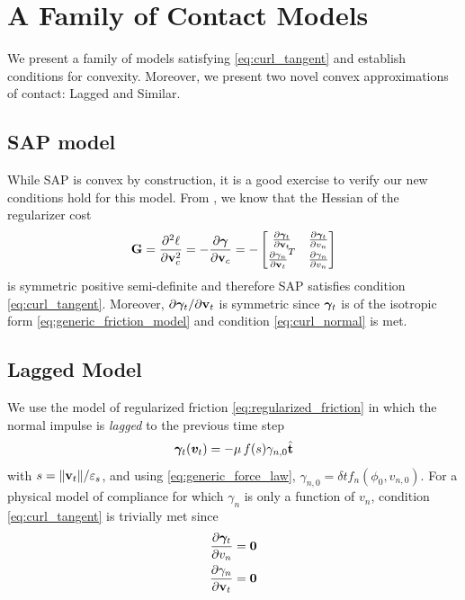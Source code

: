 \section{A Family of Contact Models}
\label{sec:models_family}

We present a family of models satisfying \eqref{eq:curl_tangent} and establish
conditions for convexity. Moreover, we present two novel convex approximations
of contact: Lagged and Similar.

\subsection{SAP model}

While SAP \cite{bib:castro2022unconstrained} is convex by construction, it is a
good exercise to verify our new conditions hold for this model. From
\cite{bib:castro2022unconstrained}, we know that the Hessian of the regularizer
cost
\begin{equation*}
    {\mathbf{G}} = \frac{\partial^2\ell}{\partial{\mathbf{v}}_c^2} = -\frac{\partial{\bm\gamma}}{\partial{\mathbf{v}}_c}=
    -\begin{bmatrix}
		\frac{\partial{\bm\gamma}_t}{\partial{\mathbf{v}}_t} & \frac{\partial{\bm\gamma}_t}{\partial v_n}\\
		\frac{\partial\gamma_n}{\partial{\mathbf{v}}_t}^T & \frac{\partial\gamma_n}{\partial v_n}\\
	\end{bmatrix}
\end{equation*}
is symmetric positive semi-definite and therefore SAP satisfies condition
\eqref{eq:curl_tangent}. Moreover, $\partial{\bm\gamma}_t/\partial{\mathbf{v}}_t$ is
symmetric since ${\bm\gamma}_t$ is of the isotropic form
\eqref{eq:generic_friction_model} and condition \eqref{eq:curl_normal} is met.

\subsection{Lagged Model}
\label{sec:lagged_model}

We use the model of regularized friction \eqref{eq:regularized_friction} in
which the normal impulse is \emph{lagged} to the previous time step
\begin{equation}
    \bgamma_t(\vf{v}_t)=-\mu\,f(s)\gamma_{n,0}\hat{\mf{t}}
    \label{eq:lagged_friction_model}
\end{equation}
with $s=\Vert{\mathbf{v}}_t\Vert/\varepsilon_s$, and using
\eqref{eq:generic_force_law}, $\gamma_{n,0}=\delta t f_n(\phi_0, v_{n,0})$. For a
physical model of compliance for which $\gamma_n$ is only a function of $v_n$,
condition \eqref{eq:curl_tangent} is trivially met since
\begin{eqnarray*}
    \frac{\partial{\bm\gamma}_t}{\partial v_n}={\mathbf{0}}\\
    \frac{\partial\gamma_n}{\partial{\mathbf{v}}_t}={\mathbf{0}}
\end{eqnarray*}

